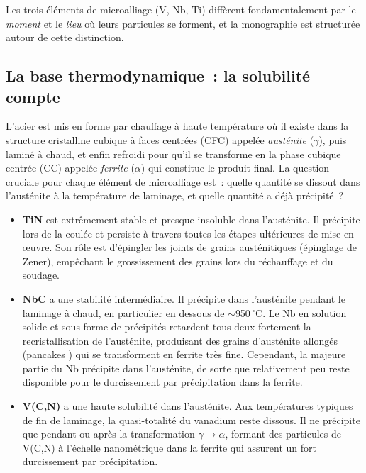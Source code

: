 \documentclass[11pt,a4paper]{article}
\begin{document}
Les trois \'el\'ements de microalliage (V, Nb, Ti) diff\`erent
fondamentalement par le \emph{moment} et le \emph{lieu} o\`u leurs
particules se forment, et la monographie est structur\'ee autour de
cette distinction.

\subsection{La base thermodynamique~: la solubilit\'e compte}

L'acier est mis en forme par chauffage \`a haute temp\'erature o\`u il
existe dans la structure cristalline cubique \`a faces centr\'ees (CFC)
appel\'ee \emph{aust\'enite} ($\gamma$), puis lamin\'e \`a chaud, et
enfin refroidi pour qu'il se transforme en la phase cubique centr\'ee
(CC) appel\'ee \emph{ferrite} ($\alpha$) qui constitue le produit final.
La question cruciale pour chaque \'el\'ement de microalliage est~: quelle
quantit\'e se dissout dans l'aust\'enite \`a la temp\'erature de
laminage, et quelle quantit\'e a d\'ej\`a pr\'ecipit\'e~?

\begin{itemize}
  \item \textbf{TiN} est extr\^emement stable et presque insoluble dans
    l'aust\'enite.  Il pr\'ecipite lors de la coul\'ee et persiste \`a
    travers toutes les \'etapes ult\'erieures de mise en \oe uvre.  Son
    r\^ole est d'\'epingler les joints de grains aust\'enitiques
    (\'epinglage de Zener), emp\^echant le grossissement des grains lors
    du r\'echauffage et du soudage.
  \item \textbf{NbC} a une stabilit\'e interm\'ediaire.  Il pr\'ecipite
    dans l'aust\'enite pendant le laminage \`a chaud, en particulier en
    dessous de $\sim$950\,${}^\circ$C.  Le Nb en solution solide et sous
    forme de pr\'ecipit\'es retardent tous deux fortement la
    recristallisation de l'aust\'enite, produisant des grains
    d'aust\'enite allong\'es (\og pancakes \fg{}) qui se transforment en
    ferrite tr\`es fine.  Cependant, la majeure partie du Nb pr\'ecipite
    dans l'aust\'enite, de sorte que relativement peu reste disponible
    pour le durcissement par pr\'ecipitation dans la ferrite.
  \item \textbf{V(C,N)} a une haute solubilit\'e dans l'aust\'enite.
    Aux temp\'eratures typiques de fin de laminage, la quasi-totalit\'e
    du vanadium reste dissous.  Il ne pr\'ecipite que pendant ou apr\`es
    la transformation $\gamma\to\alpha$, formant des particules de V(C,N)
    \`a l'\'echelle nanom\'etrique dans la ferrite qui assurent un fort
    durcissement par pr\'ecipitation.
\end{itemize}
\end{document}
